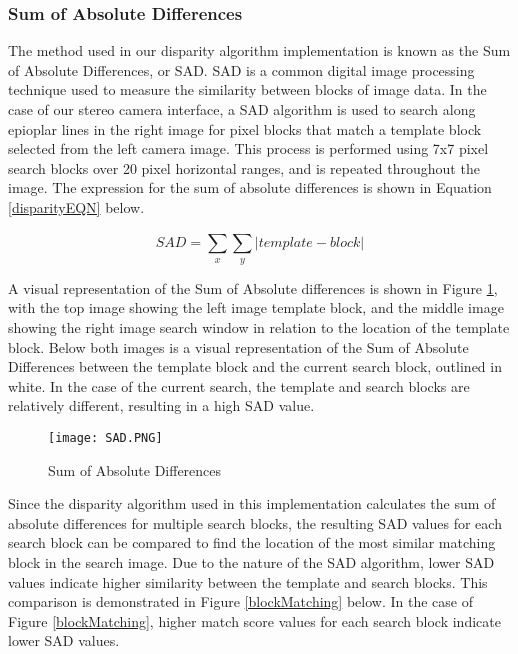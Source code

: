 \subsubsection{Sum of Absolute Differences} \label{SADexample}
The method used in our disparity algorithm implementation is known as the Sum of Absolute Differences, or SAD. SAD is a common digital image processing technique used to measure the similarity between blocks of image data. In the case of our stereo camera interface, a SAD algorithm is used to search along epioplar lines in the right image for pixel blocks that match a template block selected from the left camera image. This process is performed using 7x7 pixel search blocks over 20 pixel horizontal ranges, and is repeated throughout the image. The expression for the sum of absolute differences is shown in Equation \ref{disparityEQN} below. 
\par
\begin{equation}\label{disparityEQN}
SAD = \sum_{x}^{}\sum_{y}^{}|template-block|
\end{equation}
\par
A visual representation of the Sum of Absolute differences is shown in Figure \ref{SAD}, with the top image showing the left image template block, and the middle image showing the right image search window in relation to the location of the template block. Below both images is a visual representation of the Sum of Absolute Differences between the template block and the current search block, outlined in white. In the case of the current search, the template and search blocks are relatively different, resulting in a high SAD value. 
\par
\begin{figure}[H]
	\centerline{\texttt{[image: SAD.PNG]}}
	\caption{Sum of Absolute Differences \cite{mccormick}}
	\label{SAD}
\end{figure}
\par
Since the disparity algorithm used in this implementation calculates the sum of absolute differences for multiple search blocks, the resulting SAD values for each search block can be compared to find the location of the most similar matching block in the search image. Due to the nature of the SAD algorithm, lower SAD values indicate higher similarity between the template and search blocks. This comparison is demonstrated in Figure \ref{blockMatching} below. In the case of Figure 
\ref{blockMatching}, higher match score values for each search block indicate lower SAD values.
